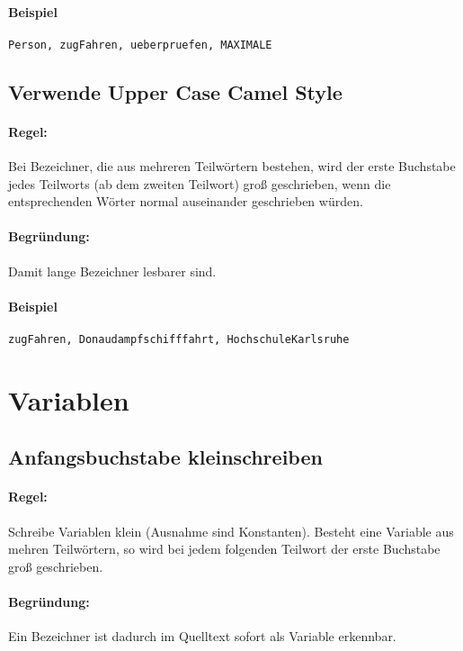 \paragraph{Beispiel}
\texttt{Person, zugFahren, ueberpruefen, MAXIMALE\textunderscore{}}

\subsection{Verwende Upper Case Camel Style}

\paragraph{Regel:} Bei Bezeichner, die aus mehreren Teilwörtern bestehen, wird der erste Buchstabe jedes Teilworts (ab dem zweiten Teilwort) groß geschrieben, wenn die entsprechenden Wörter normal auseinander geschrieben würden.
\paragraph{Begründung:} Damit lange Bezeichner lesbarer sind.

\paragraph{Beispiel}
\texttt{zugFahren, Donaudampfschifffahrt, HochschuleKarlsruhe}

\section{Variablen}

\subsection{Anfangsbuchstabe kleinschreiben}

\paragraph{Regel:} Schreibe Variablen klein (Ausnahme sind Konstanten). Besteht eine Variable aus mehren Teilwörtern, so wird bei jedem folgenden Teilwort der erste Buchstabe groß geschrieben.
\paragraph{Begründung:} Ein Bezeichner ist dadurch im Quelltext sofort als Variable erkennbar.

